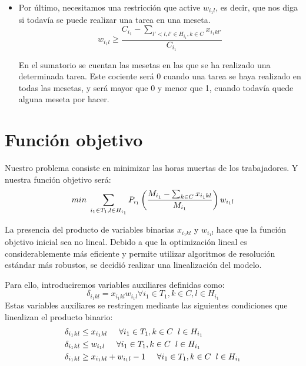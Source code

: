 \begin{itemize}
    \item  Por último, necesitamos una restricción que active $w_{i_1 l}$, es decir, que nos diga si todavía se puede realizar una tarea en una meseta. 
        \[
	        \displaystyle w_{i_1 l}\geq \frac{C_{i_1}-\sum_{l'<l, l'\in H_{i_1}, k\in C}x_{i_1 kl'}}{C_{i_1}}
        \]
	
	    En el sumatorio se cuentan las mesetas en las que se ha realizado una determinada tarea. Este cociente será $0$ cuando una tarea se haya realizado en todas las mesetas, y será mayor que 0 y menor que 1, cuando todavía quede alguna meseta por hacer. 
	
\end{itemize}


\section*{Función objetivo}
Nuestro problema consiste en minimizar las horas muertas de los trabajadores. Y nuestra función objetivo será: 
	\[
	    min\hspace{0.1cm} \sum_{i_1 \in T_1, l\in H_{i_1}}P_{i_1}\left(\frac{M_{i_1}-\sum_{k\in C}x_{i_1 kl}}{M_{i_1}}\right)w_{i_1 l}
    \]

    La presencia del producto de variables binarias $x_{i_1 kl}$ y  $w_{i_1 l}$ hace que la función objetivo inicial sea no lineal.
    Debido a que la optimización lineal es considerablemente más eficiente y permite utilizar algoritmos de resolución estándar más robustos,
    se decidió realizar una linealización del modelo.

    Para ello, introduciremos variables auxiliares definidas como:
    \[
        \delta_{i_1 k l}=x_{i_1 k l}w_{i_1 l} \forall i_1 \in T_1, k \in C, l \in H_{i_1}
    \]
    Estas variables auxiliares se restringen mediante las siguientes condiciones que linealizan el producto binario:
    \[\begin{aligned}
        \delta_{i_1 k l} &\leq x_{i_1 k l} \hspace{0.5cm} \forall i_1 \in T_1, k \in C \hspace{0.2cm} l\in H_{i_1}\\
        \delta_{i_1 k l} &\leq w_{i_1 l} \hspace{0.5cm} \forall i_1 \in T_1, k \in C \hspace{0.2cm} l\in H_{i_1}\\
	    \delta_{i_1 k l} &\geq x_{i_1 k l} + w_{i_1 l} -1 \hspace{0.5cm} \forall i_1 \in T_1, k \in C \hspace{0.2cm} l\in H_{i_1}
    \end{aligned}\]

